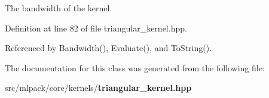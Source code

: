 The bandwidth of the kernel. 



Definition at line 82 of file triangular\-\_\-kernel.\-hpp.



Referenced by Bandwidth(), Evaluate(), and To\-String().



The documentation for this class was generated from the following file\-:\begin{DoxyCompactItemize}
\item 
src/mlpack/core/kernels/{\bf triangular\-\_\-kernel.\-hpp}\end{DoxyCompactItemize}
